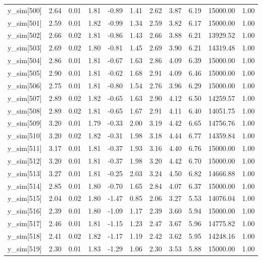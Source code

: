 \begin{table}[ht]
\begin{tabular}{rrrrrrrrrrr}
  y\_sim[500] & 2.64 & 0.01 & 1.81 & -0.89 & 1.41 & 2.62 & 3.87 & 6.19 & 15000.00 & 1.00 \\ 
  y\_sim[501] & 2.59 & 0.01 & 1.82 & -0.99 & 1.34 & 2.59 & 3.82 & 6.17 & 15000.00 & 1.00 \\ 
  y\_sim[502] & 2.66 & 0.02 & 1.81 & -0.86 & 1.43 & 2.66 & 3.88 & 6.21 & 13929.52 & 1.00 \\ 
  y\_sim[503] & 2.69 & 0.02 & 1.80 & -0.81 & 1.45 & 2.69 & 3.90 & 6.21 & 14319.48 & 1.00 \\ 
  y\_sim[504] & 2.86 & 0.01 & 1.81 & -0.67 & 1.63 & 2.86 & 4.09 & 6.39 & 15000.00 & 1.00 \\ 
  y\_sim[505] & 2.90 & 0.01 & 1.81 & -0.62 & 1.68 & 2.91 & 4.09 & 6.46 & 15000.00 & 1.00 \\ 
  y\_sim[506] & 2.75 & 0.01 & 1.81 & -0.80 & 1.54 & 2.76 & 3.96 & 6.29 & 15000.00 & 1.00 \\ 
  y\_sim[507] & 2.89 & 0.02 & 1.82 & -0.65 & 1.63 & 2.90 & 4.12 & 6.50 & 14259.57 & 1.00 \\ 
  y\_sim[508] & 2.89 & 0.02 & 1.81 & -0.65 & 1.67 & 2.91 & 4.11 & 6.40 & 14051.75 & 1.00 \\ 
  y\_sim[509] & 3.20 & 0.01 & 1.79 & -0.33 & 2.00 & 3.19 & 4.42 & 6.65 & 14756.76 & 1.00 \\ 
  y\_sim[510] & 3.20 & 0.02 & 1.82 & -0.31 & 1.98 & 3.18 & 4.44 & 6.77 & 14359.84 & 1.00 \\ 
  y\_sim[511] & 3.17 & 0.01 & 1.81 & -0.37 & 1.93 & 3.16 & 4.40 & 6.76 & 15000.00 & 1.00 \\ 
  y\_sim[512] & 3.20 & 0.01 & 1.81 & -0.37 & 1.98 & 3.20 & 4.42 & 6.70 & 15000.00 & 1.00 \\ 
  y\_sim[513] & 3.27 & 0.01 & 1.81 & -0.25 & 2.03 & 3.24 & 4.50 & 6.82 & 14666.88 & 1.00 \\ 
  y\_sim[514] & 2.85 & 0.01 & 1.80 & -0.70 & 1.65 & 2.84 & 4.07 & 6.37 & 15000.00 & 1.00 \\ 
  y\_sim[515] & 2.04 & 0.02 & 1.80 & -1.47 & 0.85 & 2.06 & 3.27 & 5.53 & 14076.04 & 1.00 \\ 
  y\_sim[516] & 2.39 & 0.01 & 1.80 & -1.09 & 1.17 & 2.39 & 3.60 & 5.94 & 15000.00 & 1.00 \\ 
  y\_sim[517] & 2.46 & 0.01 & 1.81 & -1.15 & 1.23 & 2.47 & 3.67 & 5.96 & 14775.82 & 1.00 \\ 
  y\_sim[518] & 2.41 & 0.02 & 1.82 & -1.17 & 1.19 & 2.42 & 3.62 & 5.95 & 14248.16 & 1.00 \\ 
  y\_sim[519] & 2.30 & 0.01 & 1.83 & -1.29 & 1.06 & 2.30 & 3.53 & 5.88 & 15000.00 & 1.00 \\ 

\end{tabular}
\end{table}
